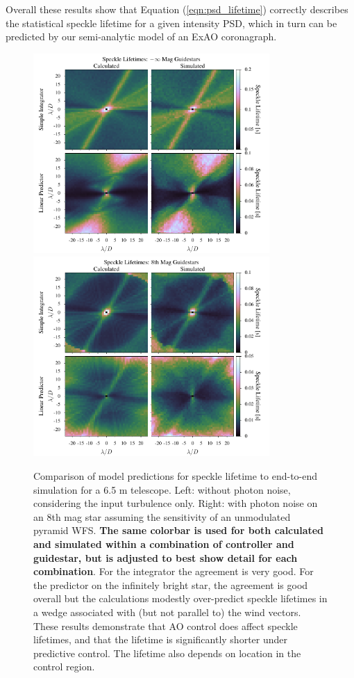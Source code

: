 \documentclass[10pt,preprint]{aastex631}
\begin{document}
Overall these results show that Equation (\ref{eqn:psd_lifetime}) correctly describes the statistical speckle lifetime for a given intensity PSD, which in turn can be predicted by our semi-analytic model of an ExAO coronagraph.


\begin{figure}
\hspace{-0.3in}
\includegraphics[width=3.54in]{lifetimes0mag.pdf}
\includegraphics[width=3.54in]{lifetimes8mag.pdf}
\caption{Comparison of model predictions for speckle lifetime to end-to-end simulation for a 6.5 m telescope.  Left: without photon noise, considering the input turbulence only.  Right: with photon noise on an 8th mag star assuming the sensitivity of an unmodulated pyramid WFS. \textbf{The same colorbar is used for both calculated and simulated within a combination of controller and guidestar, but is adjusted to best show detail for each combination}. For the integrator the agreement is very good.  For the predictor on the infinitely bright star, the agreement is good overall but the calculations modestly over-predict speckle lifetimes in a wedge associated with (but not parallel to) the wind vectors.  These results demonstrate that AO control does affect speckle lifetimes, and that the lifetime is significantly shorter under predictive control.  The lifetime also depends on location in the control region. \label{fig:lifetime_2Dcomp}}
\end{figure}
\end{document}
